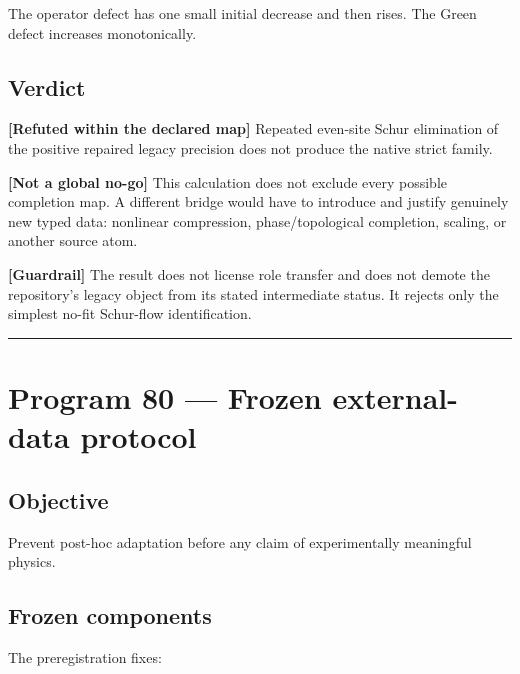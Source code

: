 \documentclass[11pt,a4paper,openany]{report}
\begin{document}
The operator defect has one small initial decrease and then rises. The Green defect increases monotonically.

\section{Verdict}

\textbf{[Refuted within the declared map]} Repeated even-site Schur elimination of the positive repaired legacy precision does not produce the native strict family.

\textbf{[Not a global no-go]} This calculation does not exclude every possible completion map. A different bridge would have to introduce and justify genuinely new typed data: nonlinear compression, phase/\allowbreak{}topological completion, scaling, or another source atom.

\textbf{[Guardrail]} The result does not license role transfer and does not demote the repository's legacy object from its stated intermediate status. It rejects only the simplest no-fit Schur-flow identification.

\par\medskip\hrule\medskip

\chapter{Program 80 --- Frozen external-data protocol}

\section{Objective}

Prevent post-hoc adaptation before any claim of experimentally meaningful physics.

\section{Frozen components}

The preregistration fixes:
\end{document}
